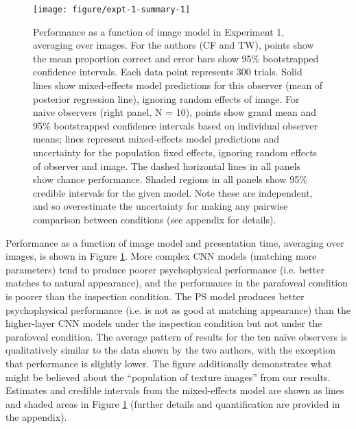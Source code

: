 \documentclass[article, 11pt,a4paper,natbib]{apa6}\usepackage[]{graphicx}\usepackage[]{color}
\newenvironment{knitrout}{}{} %
\begin{document}
\begin{knitrout}
\color{fgcolor}\begin{figure}
\texttt{[image: figure/expt-1-summary-1]} \caption[Performance as a function of image model in Experiment 1, averaging over images]{Performance as a function of image model in Experiment 1, averaging over images. 
              For the authors (CF and TW), points show the mean proportion correct and error bars show 95\% bootstrapped confidence intervals. Each data point represents 300 trials. 
Solid lines show mixed-effects model predictions for this observer (mean of posterior regression line), ignoring random effects of image.
For naive observers (right panel, N = 10), points show grand mean and 95\% bootstrapped confidence intervals based on individual observer means; lines represent mixed-effects model predictions and uncertainty for the population fixed effects, ignoring random effects of observer and image.
The dashed horizontal lines in all panels show chance performance.
Shaded regions in all panels show 95\% credible intervals for the given model. 
Note these are independent, and so overestimate the uncertainty for making any pairwise comparison between conditions (see appendix for details).
}\label{fig:expt-1-summary}
\end{figure}


\end{knitrout}

Performance as a function of image model and presentation time, averaging over images, is shown in Figure \ref{fig:expt-1-summary}.
More complex CNN models (matching more parameters) tend to produce poorer psychophysical performance (i.e. better matches to natural appearance), and the performance in the parafoveal condition is poorer than the inspection condition.
The PS model produces better psychophysical performance (i.e. is not as good at matching appearance) than the higher-layer CNN models under the inspection condition but not under the parafoveal condition.
The average pattern of results for the ten na\"{i}ve observers is qualitatively similar to the data shown by the two authors, with the exception that performance is slightly lower.
The figure additionally demonstrates what might be believed about the ``population of texture images'' from our results.
Estimates and credible intervals from the mixed-effects model are shown as lines and shaded areas in Figure \ref{fig:expt-1-summary} (further details and quantification are provided in the appendix).
\end{document}
